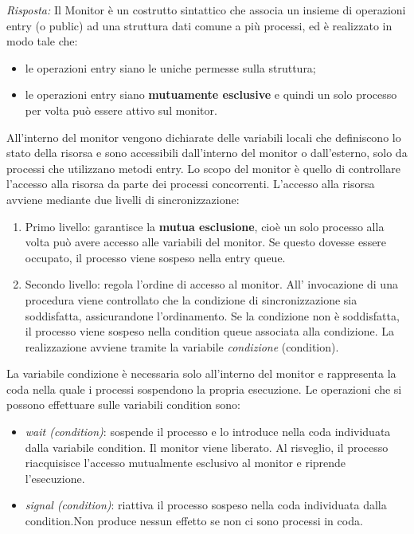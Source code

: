 \documentclass{article}
\newenvironment{solution}
    {\textit{Risposta:}}
    {}
\begin{document}
\begin{solution}
Il Monitor è un costrutto sintattico che associa un insieme di operazioni entry (o public) ad una struttura dati comune a più processi, ed è realizzato in modo tale che:
\begin{itemize}
    \item le operazioni entry siano le uniche permesse sulla struttura;
    \item le operazioni entry siano \textbf{mutuamente esclusive} e quindi un solo processo per volta può essere attivo sul monitor.
\end{itemize}
All’interno del monitor vengono dichiarate delle variabili locali che definiscono lo stato della risorsa e sono accessibili dall’interno del monitor o dall’esterno, solo da processi che utilizzano metodi entry.
\newline
Lo scopo del monitor è quello di controllare l’accesso alla risorsa da parte dei processi concorrenti.  
\newline
\newline
L’accesso alla risorsa avviene mediante due livelli di sincronizzazione:  
\begin{enumerate}
    \item Primo livello: garantisce la \textbf{mutua esclusione}, cioè un solo processo alla volta può avere accesso alle variabili del monitor. Se questo dovesse essere occupato, il processo viene sospeso nella entry queue. 
    \item Secondo livello: regola l’ordine di accesso al monitor. All' invocazione di una procedura viene controllato che la condizione di sincronizzazione sia soddisfatta, assicurandone l’ordinamento.
    \newline
    Se la condizione non è soddisfatta, il processo viene sospeso nella condition queue associata alla condizione.
    \newline
    La realizzazione avviene tramite la variabile \textit{condizione} (condition). 
\end{enumerate}
La variabile condizione è necessaria solo all’interno del monitor e rappresenta la coda nella quale i processi sospendono la propria esecuzione.
\newline
Le operazioni che si possono effettuare sulle variabili condition sono:
\begin{itemize}
    \item \emph{wait (condition)}: sospende il processo e lo introduce nella coda individuata dalla variabile condition. Il monitor viene liberato. Al risveglio, il processo riacquisisce l’accesso mutualmente esclusivo al monitor e riprende l’esecuzione.
    \item \emph{signal (condition)}: riattiva il processo sospeso nella coda individuata dalla condition.\newline Non produce nessun effetto se non ci sono processi in coda.
\end{itemize}
\end{solution}
\end{document}
